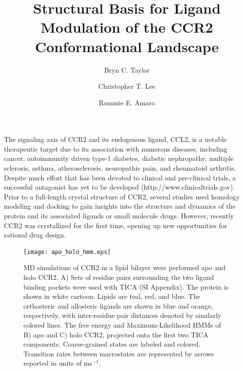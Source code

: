 \documentclass[9pt,twocolumn,twoside]{pnas-new}
\title{Structural Basis for Ligand Modulation of the CCR2 Conformational Landscape}
\author[a,b]{Bryn C. Taylor}
\author[a]{Christopher T. Lee}
\author[a,1]{Rommie E. Amaro}
\affil[a]{Department of Chemistry and Biochemistry, University of California San Diego, 9500 Gilman Drive, La Jolla, California, 92093}
\affil[b]{Biomedical Sciences Graduate Program, University of California San Diego}
\begin{document}
\verticaladjustment{-2pt}

\maketitle
\thispagestyle{firststyle}



The signaling axis of CCR2 and its endogenous ligand, CCL2, is a notable therapeutic target due to its association with numerous diseases, including cancer, autoimmunity driven type-1 diabetes, diabetic nephropathy, multiple sclerosis, asthma, atherosclerosis, neuropathic pain, and rheumatoid arthritis\cite{Ben-Baruch2006,OConnor2015,Solomon2010}.
Despite much effort that has been devoted to clinical and pre-clinical trials, a successful antagonist has yet to be developed\cite{Pease2009, Pease2009a, Scholten2012,Lim2016,Solari2015,Horuk2009,https://www.clinicaltrials.gov} (http://www.clinicaltrials.gov).
Prior to a full-length crystal structure of CCR2, several studies used homology modeling and docking to gain insights into the structure and dynamics of the protein and its associated ligands or small molecule drugs\cite{Shahlaei2013,Chavan2012,Kothandan2012}.
However, recently CCR2 was crystallized for the first time\cite{Zheng2016}, opening up new opportunities for rational drug design.

\begin{figure}
\centering
\texttt{[image: apo\_holo\_hmm.eps]}
\caption{MD simulations of CCR2 in a lipid bilayer were performed apo and holo CCR2. A) Sets of residue pairs surrounding the two ligand binding pockets were used with TICA (SI Appendix). The protein is shown in white cartoon. Lipids are teal, red, and blue. The orthosteric and allosteric ligands are shown in blue and orange, respectively, with inter-residue pair distances denoted by similarly colored lines. The free energy and Maximum-Likelihood HMMs of B) apo and C) holo CCR2, projected onto the first two TICA components. Coarse-grained states are labeled and colored. Transition rates between macrostates are represented by arrows reported in units of ms$^{-1}$.}
\label{fig:apo_holo_hmm}
\end{figure}
\end{document}
